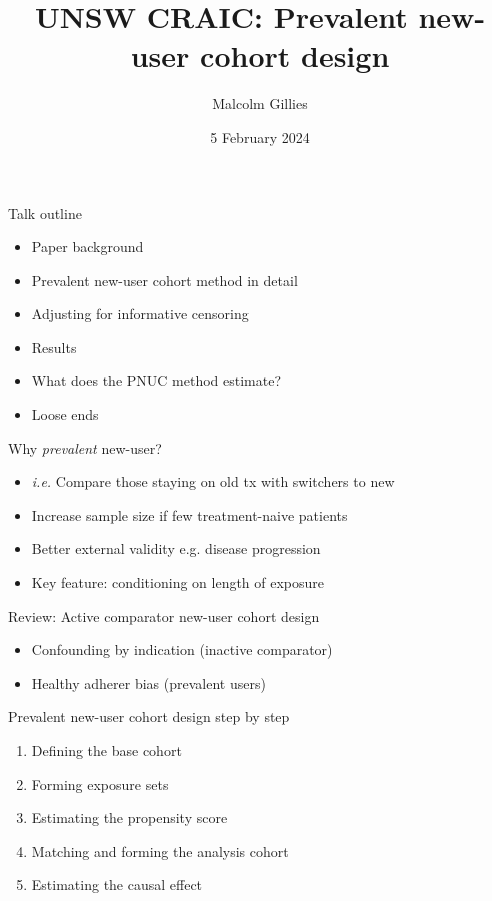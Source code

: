 \documentclass[aspectratio=169,12pt]{beamer} %
\title{UNSW CRAIC: Prevalent new-user cohort design}
\author{Malcolm Gillies}
\institute{\url{https://github.com/mbg-unsw/pnuc}}
\date{5 February 2024}
\begin{document}
{
\begin{frame}
\titlepage
\end{frame}
}

\begin{frame}{Talk outline}
    \begin{itemize}
	\item Paper background
	\item Prevalent new-user cohort method in detail
	\item Adjusting for informative censoring
	\item Results
	\item What does the PNUC method estimate?
	\item Loose ends
    \end{itemize}
\end{frame}

\begin{frame}{Why \emph{prevalent} new-user?}
    \begin{itemize}
	\item \emph{i.e.} Compare those staying on old tx with switchers to new
	\item Increase sample size if few treatment-naive patients
	\item Better external validity e.g. disease progression
	\item Key feature: conditioning on length of exposure
    \end{itemize}
\end{frame}

\begin{frame}{Review: Active comparator new-user cohort design}
    \begin{itemize}
	\item Confounding by indication (inactive comparator)
	\item Healthy adherer bias (prevalent users)
    \end{itemize}
\end{frame}

\begin{frame}{Prevalent new-user cohort design step by step}
    \begin{enumerate}
	\item Defining the base cohort
	\item Forming exposure sets
	\item Estimating the propensity score
	\item Matching and forming the analysis cohort
	\item Estimating the causal effect
    \end{enumerate}
\end{frame}
\end{document}

